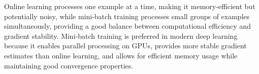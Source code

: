 \begin{remark}
Online learning processes one example at a time, making it memory-efficient but potentially noisy, while mini-batch training processes small groups of examples simultaneously, providing a good balance between computational efficiency and gradient stability. Mini-batch training is preferred in modern deep learning because it enables parallel processing on GPUs, provides more stable gradient estimates than online learning, and allows for efficient memory usage while maintaining good convergence properties.
\end{remark}

